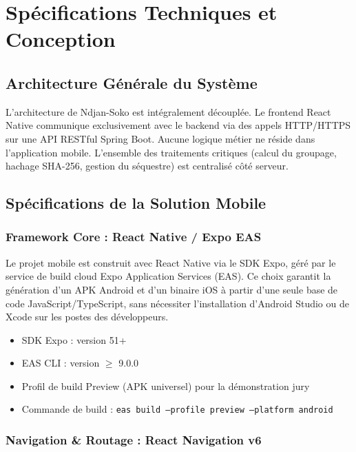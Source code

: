 \documentclass[12pt,a4paper]{report}
\begin{document}
\chapter{Spécifications Techniques et Conception}

\section{Architecture Générale du Système}

L'architecture de Ndjan-Soko est intégralement découplée. Le frontend React Native communique exclusivement avec le backend via des appels HTTP/HTTPS sur une API RESTful Spring Boot. Aucune logique métier ne réside dans l'application mobile. L'ensemble des traitements critiques (calcul du groupage, hachage SHA-256, gestion du séquestre) est centralisé côté serveur.

\section{Spécifications de la Solution Mobile}

\subsection{Framework Core : React Native / Expo EAS}

Le projet mobile est construit avec React Native via le SDK Expo, géré par le service de build cloud Expo Application Services (EAS). Ce choix garantit la génération d'un APK Android et d'un binaire iOS à partir d'une seule base de code JavaScript/TypeScript, sans nécessiter l'installation d'Android Studio ou de Xcode sur les postes des développeurs.

\begin{itemize}
  \item SDK Expo : version 51+
  \item EAS CLI : version $\geq$ 9.0.0
  \item Profil de build Preview (APK universel) pour la démonstration jury
  \item Commande de build : \texttt{eas build --profile preview --platform android}
\end{itemize}

\subsection{Navigation \& Routage : React Navigation v6}
\end{document}
